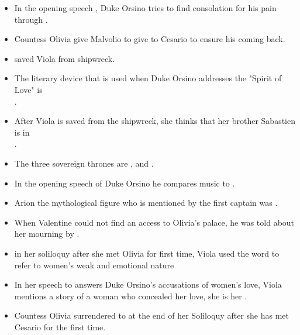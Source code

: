 \documentclass[12pt, a4paper]{article}
\begin{document}
\begin{itemize}
  \item[\ding{99}] In the opening speech , Duke Orsino tries to find consolation for his pain through .

  \item[\ding{99}] Countess Olivia give Malvolio  to give to Cesario to ensure his coming back.

  \item[\ding{99}]  saved Viola from shipwreck.

  \item[\ding{99}] The literary device that is used when Duke Orsino addresses the "Spirit of Love" is\\ .

  \item[\ding{99}] After Viola is saved from the shipwreck, she thinks that her brother Sabastien is in \\ .

  \item[\ding{99}] The three sovereign thrones are ,  and .

  \item[\ding{99}] In the opening speech of Duke Orsino he compares music to .

  \item[\ding{99}] Arion the mythological figure who is mentioned by the first captain was .

  \item[\ding{99}] When Valentine could not find an access to Olivia's palace, he was told about her mourning by .

  \item[\ding{99}] in her soliloquy after she met Olivia for first time, Viola used the word   to refer to women's weak and emotional nature

  \item[\ding{99}] In her speech to answers Duke Orsino's accusations of women's love, Viola mentions 
    a story of a woman who concealed her love, she is her .

  \item[\ding{99}] Countess Olivia surrendered to  at the end of her Soliloquy after she has met Cesario for the first time.


\end{itemize}
\end{document}
